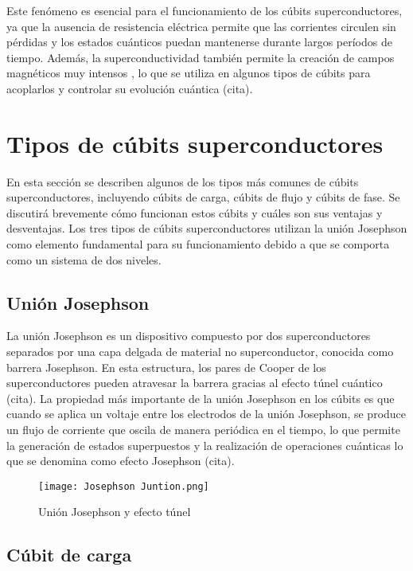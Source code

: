 \documentclass[12pt]{article}
\begin{document}
Este fenómeno es esencial para el funcionamiento de los cúbits superconductores, ya que la ausencia de resistencia eléctrica permite que las corrientes circulen sin pérdidas y los estados cuánticos puedan mantenerse durante largos períodos de tiempo. Además, la superconductividad también permite la creación de campos magnéticos muy intensos \cite{tyler_measurements_2004}, lo que se utiliza en algunos tipos de cúbits para acoplarlos y controlar su evolución cuántica (cita).

\section{Tipos de cúbits superconductores}

En esta sección se describen algunos de los tipos más comunes de cúbits superconductores, incluyendo cúbits de carga, cúbits de flujo y cúbits de fase. Se discutirá brevemente cómo funcionan estos cúbits y cuáles son sus ventajas y desventajas. Los tres tipos de cúbits superconductores utilizan la unión Josephson como elemento fundamental para su funcionamiento debido a que se comporta como un sistema de dos niveles. 
\subsection{Unión Josephson}

La unión Josephson es un dispositivo compuesto por dos superconductores separados por una capa delgada de material no superconductor, conocida como barrera Josephson. En esta estructura, los pares de Cooper de los superconductores pueden atravesar la barrera gracias al efecto túnel cuántico (cita). La propiedad más importante de la unión Josephson en los cúbits es que cuando se aplica un voltaje entre los electrodos de la unión Josephson, se produce un flujo de corriente que oscila de manera periódica en el tiempo, lo que permite la generación de estados superpuestos y la realización de operaciones cuánticas lo que se denomina como efecto Josephson (cita).  \\
\begin{figure}[ht]
    \centering
    \texttt{[image: Josephson Juntion.png]}
    \caption{Unión Josephson y efecto túnel \cite{noauthor_squid_nodate}}
    \label{fig:Unión Josephsone}
  \end{figure}

\subsection{Cúbit de carga}
\end{document}

